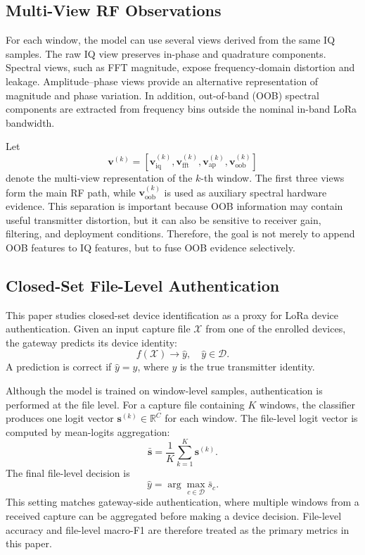 \subsection{Multi-View RF Observations}

For each window, the model can use several views derived from the same IQ samples. The raw IQ view preserves in-phase and quadrature components. Spectral views, such as FFT magnitude, expose frequency-domain distortion and leakage. Amplitude--phase views provide an alternative representation of magnitude and phase variation. In addition, out-of-band (OOB) spectral components are extracted from frequency bins outside the nominal in-band LoRa bandwidth.

Let
\begin{equation}
    \mathbf{v}^{(k)}
    =
    \left[
    \mathbf{v}^{(k)}_{\mathrm{iq}},
    \mathbf{v}^{(k)}_{\mathrm{fft}},
    \mathbf{v}^{(k)}_{\mathrm{ap}},
    \mathbf{v}^{(k)}_{\mathrm{oob}}
    \right]
\end{equation}
denote the multi-view representation of the $k$-th window. The first three views form the main RF path, while $\mathbf{v}^{(k)}_{\mathrm{oob}}$ is used as auxiliary spectral hardware evidence. This separation is important because OOB information may contain useful transmitter distortion, but it can also be sensitive to receiver gain, filtering, and deployment conditions. Therefore, the goal is not merely to append OOB features to IQ features, but to fuse OOB evidence selectively.

\subsection{Closed-Set File-Level Authentication}

This paper studies closed-set device identification as a proxy for LoRa device authentication. Given an input capture file $\mathcal{X}$ from one of the enrolled devices, the gateway predicts its device identity:
\begin{equation}
    f(\mathcal{X}) \rightarrow \hat{y}, \quad \hat{y} \in \mathcal{D}.
\end{equation}
A prediction is correct if $\hat{y}=y$, where $y$ is the true transmitter identity.

Although the model is trained on window-level samples, authentication is performed at the file level. For a capture file containing $K$ windows, the classifier produces one logit vector $\mathbf{s}^{(k)} \in \mathbb{R}^{C}$ for each window. The file-level logit vector is computed by mean-logits aggregation:
\begin{equation}
    \bar{\mathbf{s}}
    =
    \frac{1}{K}
    \sum_{k=1}^{K}
    \mathbf{s}^{(k)}.
\end{equation}
The final file-level decision is
\begin{equation}
    \hat{y}
    =
    \arg\max_{c \in \mathcal{D}}
    \bar{s}_{c}.
\end{equation}
This setting matches gateway-side authentication, where multiple windows from a received capture can be aggregated before making a device decision. File-level accuracy and file-level macro-F1 are therefore treated as the primary metrics in this paper.

